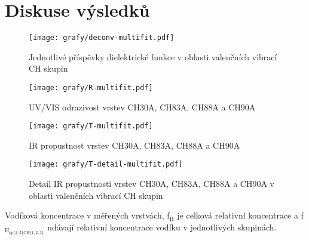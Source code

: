 \chapter{Diskuse výsledků}

\begin{figure}[ht]
	\texttt{[image: grafy/deconv-multifit.pdf]}
	\caption{Jednotlivé příspěvky dielektrické funkce v oblasti valenčních vibrací CH skupin}
\end{figure}

\begin{figure}[ht]
	\texttt{[image: grafy/R-multifit.pdf]}
	\caption{UV/VIS odrazivost vrstev CH30A, CH83A, CH88A a CH90A}
\end{figure}

\begin{figure}[ht]
	\texttt{[image: grafy/T-multifit.pdf]}
	\caption{IR propustnost vrstev CH30A, CH83A, CH88A a CH90A}
\end{figure}

\begin{figure}[ht]
	\texttt{[image: grafy/T-detail-multifit.pdf]}
	\caption{Detail IR propustnosti vrstev CH30A, CH83A, CH88A a CH90A v oblasti valenčních vibrací CH skupin}
\end{figure}

\begin{table}[htbp]
 \centering
 
 \caption{Vodíková koncentrace v měřených vrstvách, f$_\mathrm{H}$ je celková relativní koncentrace a f$_\mathrm{H_{sp\{2,3\}CH\{1,2,3\}}}$ udávají relativní koncentrace vodíku v jednotlivých skupinách.}
\label{deppodminky}
\end{table}

\cleardoublepage
